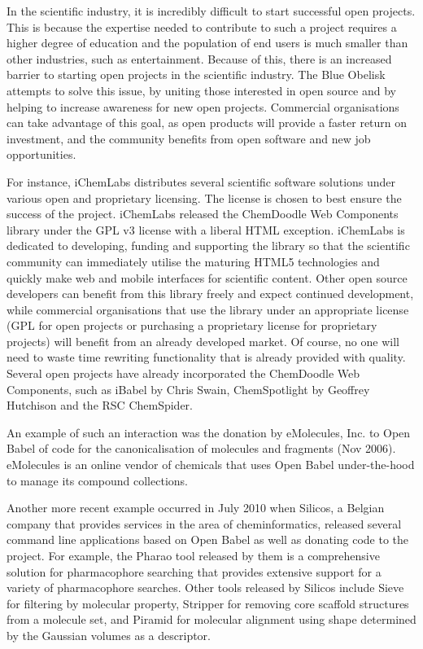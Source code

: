 \documentclass[10pt]{bmc_article}
\newenvironment{bmcformat}{\begin{raggedright}\baselineskip20pt\sloppy\setboolean{publ}{false}}{\end{raggedright}\baselineskip20pt\sloppy}
\begin{document}
\begin{bmcformat}
In the scientific industry, it is incredibly difficult to start successful open projects. This is because the expertise needed to contribute to such a project requires a higher degree of education and the population of end users is much smaller than other industries, such as entertainment. Because of this, there is an increased barrier to starting open projects in the scientific industry. The Blue Obelisk attempts to solve this issue, by uniting those interested in open source and by helping to increase awareness for new open projects. Commercial organisations can take advantage of this goal, as open products will provide a faster return on investment, and the community benefits from open software and new job opportunities.

For instance, iChemLabs distributes several scientific software solutions under various open and proprietary licensing. The license is chosen to best ensure the success of the project. iChemLabs released the ChemDoodle Web Components library under the GPL v3 license with a liberal HTML exception. iChemLabs is dedicated to developing, funding and supporting the library so that the scientific community can immediately utilise the maturing HTML5 technologies and quickly make web and mobile interfaces for scientific content. Other open source developers can benefit from this library freely and expect continued development, while commercial organisations that use the library under an appropriate license (GPL for open projects or purchasing a proprietary license for proprietary projects) will benefit from an already developed market. Of course, no one will need to waste time rewriting functionality that is already provided with quality. Several open projects have already incorporated the ChemDoodle Web Components, such as iBabel by Chris Swain\cite{iBabel}, ChemSpotlight by Geoffrey Hutchison\cite{chemspotlight} and the RSC ChemSpider\cite{chemspider_chemdoodle}.

An example of such an interaction was the donation by eMolecules, Inc.
to Open Babel of code for the canonicalisation of molecules and
fragments (Nov 2006). eMolecules is an online vendor of chemicals that
uses Open Babel under-the-hood to manage its compound collections.

Another more recent example occurred in July 2010 when Silicos, a
Belgian company that provides services
in the area of cheminformatics, released several command line
applications based on Open Babel as well as donating code to the
project. For example, the Pharao
tool released by them is a comprehensive solution for pharmacophore
searching that provides extensive support for a variety of
pharmacophore searches. Other tools released by Silicos include Sieve for
filtering by molecular property, Stripper for removing core scaffold
structures from a molecule set, and Piramid for molecular alignment
using shape determined by the Gaussian volumes as a descriptor.


\end{bmcformat}
\end{document}

